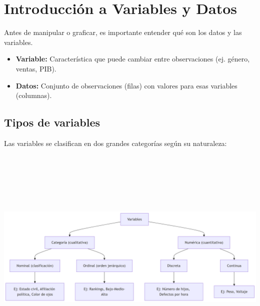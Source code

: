 \documentclass[
  spanish,
  letterpaper,
  DIV=11,
  numbers=noendperiod]{scrreprt}
\providecommand{\tightlist}{%
  \setlength{\itemsep}{0pt}\setlength{\parskip}{0pt}}
\begin{document}
\section{Introducción a Variables y
Datos}\label{introducciuxf3n-a-variables-y-datos}

Antes de manipular o graficar, es importante entender qué son los datos
y las variables.

\begin{tcolorbox}[enhanced jigsaw, arc=.35mm, leftrule=.75mm, colbacktitle=quarto-callout-note-color!10!white, left=2mm, opacitybacktitle=0.6, toptitle=1mm, title=\textcolor{quarto-callout-note-color}{\faInfo}\hspace{0.5em}{Definiciones clave}, colframe=quarto-callout-note-color-frame, toprule=.15mm, colback=white, rightrule=.15mm, opacityback=0, coltitle=black, breakable, bottomtitle=1mm, titlerule=0mm, bottomrule=.15mm]

\begin{itemize}
\tightlist
\item
  \textbf{Variable:} Característica que puede cambiar entre
  observaciones (ej. género, ventas, PIB).\\
\item
  \textbf{Datos:} Conjunto de observaciones (filas) con valores para
  esas variables (columnas).
\end{itemize}

\end{tcolorbox}

\subsection{Tipos de variables}\label{tipos-de-variables}

Las variables se clasifican en dos grandes categorías según su
naturaleza:

\includegraphics[width=11.72in,height=4.23in]{capitulo2_files/figure-latex/mermaid-figure-1.png}
\end{document}
